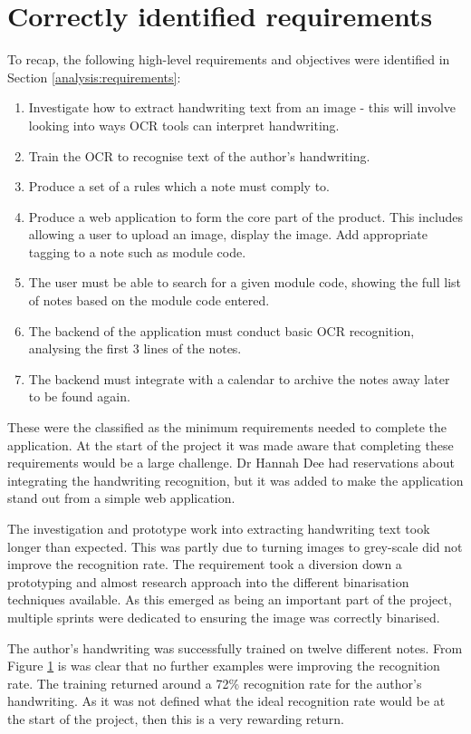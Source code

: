 \section{Correctly identified requirements}
To recap, the following high-level requirements and objectives were identified in Section \ref{analysis:requirements}:
\begin{enumerate}
	\item Investigate how to extract handwriting text from an image - this will involve looking into ways OCR tools can interpret handwriting.
	\item Train the OCR to recognise text of the author's handwriting.
	\item Produce a set of a rules which a note must comply to.
	\item Produce a web application to form the core part of the product. This includes allowing a user to upload an image, display the image. Add appropriate tagging to a note such as module code.
	\item The user must be able to search for a given module code, showing the full list of notes based on the module code entered.
	\item The backend of the application must conduct basic OCR recognition, analysing the first 3 lines of the notes.
	\item The backend must integrate with a calendar to archive the notes away later to be found again.
\end{enumerate}

\noindent
These were the classified as the minimum requirements needed to complete the application. At the start of the project it was made aware that completing these requirements would be a large challenge. Dr Hannah Dee had reservations about integrating the handwriting recognition, but it was added to make the application stand out from a simple web application.

The investigation and prototype work into extracting handwriting text took longer than expected. This was partly due to turning images to grey-scale did not improve the recognition rate. The requirement took a diversion down a prototyping and almost research approach into the different binarisation techniques available. As this emerged as being an important part of the project, multiple sprints were dedicated to ensuring the image was correctly binarised.

The author's handwriting was successfully trained on twelve different notes. From Figure \ref{} is was clear that no further examples were improving the recognition rate. The training returned around a 72\% recognition rate for the author's handwriting. As it was not defined what the ideal recognition rate would be at the start of the project, then this is a very rewarding return.

